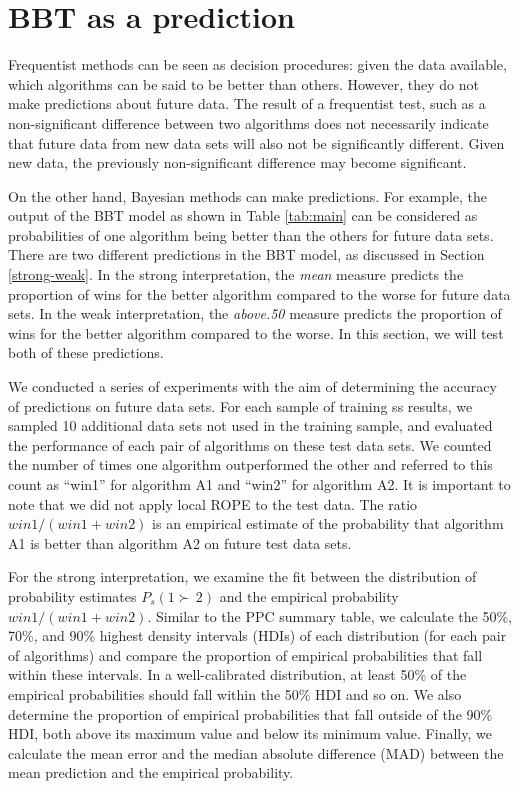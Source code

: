 \documentclass[twoside,11pt,preprint]{article}
\begin{document}
\hypertarget{bbt-as-a-prediction}{%
\section{\texorpdfstring{BBT as a prediction \label{predictive}}{BBT as a prediction }}\label{bbt-as-a-prediction}}

Frequentist methods can be seen as decision procedures: given the data available, which algorithms can be said to be better than others. However, they do not make predictions about future data. The result of a frequentist test, such as a non-significant difference between two algorithms does not necessarily indicate that future data from new data sets will also not be significantly different. Given new data, the previously non-significant difference may become significant.

On the other hand, Bayesian methods can make predictions. For example, the output of the BBT model as shown in Table \ref{tab:main} can be considered as probabilities of one algorithm being better than the others for future data sets. There are two different predictions in the BBT model, as discussed in Section \ref{strong-weak}. In the strong interpretation, the {\em mean} measure predicts the proportion of wins for the better algorithm compared to the worse for future data sets. In the weak interpretation, the {\em above.50} measure predicts the proportion of wins for the better algorithm compared to the worse. In this section, we will test both of these predictions.

We conducted a series of experiments with the aim of determining the accuracy of predictions on future data sets. For each sample of training ss results, we sampled 10 additional data sets not used in the training sample, and evaluated the performance of each pair of algorithms on these test data sets. We counted the number of times one algorithm outperformed the other and referred to this count as ``win1'' for algorithm A1 and ``win2'' for algorithm A2. It is important to note that we did not apply local ROPE to the test data. The ratio \(win1/(win1+win2)\) is an empirical estimate of the probability that algorithm A1 is better than algorithm A2 on future test data sets.

For the strong interpretation, we examine the fit between the distribution of probability estimates \(P_s(1 \succ\,2)\) and the empirical probability \(win1/(win1+win2)\). Similar to the PPC summary table, we calculate the 50\%, 70\%, and 90\% highest density intervals (HDIs) of each distribution (for each pair of algorithms) and compare the proportion of empirical probabilities that fall within these intervals. In a well-calibrated distribution, at least 50\% of the empirical probabilities should fall within the 50\% HDI and so on. We also determine the proportion of empirical probabilities that fall outside of the 90\% HDI, both above its maximum value and below its minimum value. Finally, we calculate the mean error and the median absolute difference (MAD) between the mean prediction and the empirical probability.
\end{document}
